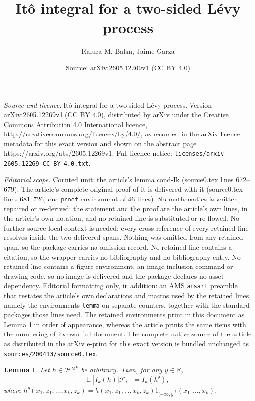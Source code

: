 \documentclass[10pt,a4paper]{amsart}
\title{It\^o integral for a two-sided L\'evy process}
\author{Raluca M. Balan, Jaime Garza}
\date{Source: arXiv:2605.12269v1 (CC BY 4.0)}
\newtheorem{lemma}{Lemma}
\def\bE{\mathbb{E}}
\def\bR{\mathbb{R}}
\def\cF{\mathcal{F}}
\def\cH{\mathcal{H}}
\begin{document}
\maketitle

\noindent\emph{Source and licence.} It\^o integral for a two-sided L\'evy process. Version arXiv:2605.12269v1 (CC BY 4.0), distributed by arXiv under the Creative Commons Attribution 4.0 International licence, http://creativecommons.org/licenses/by/4.0/, as recorded in the arXiv licence metadata for this exact version and shown on the abstract page https://arxiv.org/abs/2605.12269v1. Full licence notice: \texttt{licenses/arxiv-2605.12269-CC-BY-4.0.txt}.\par\smallskip

\noindent\textit{Editorial scope.} Counted unit: the article's lemma cond-Ik (source0.tex lines 672--679). The article's complete original proof of it is delivered with it (source0.tex lines 681--726, one \texttt{proof} environment of 46 lines). No mathematics is written, repaired or re-derived: the statement and the proof are the article's own lines, in the article's own notation, and no retained line is substituted or re-flowed.  No further source-local context is needed: every cross-reference of every retained line resolves inside the two delivered spans.  Nothing was omitted from any retained span, so the package carries no omission record.  No retained line contains a citation, so the wrapper carries no bibliography and no bibliography entry.  No retained line contains a figure environment, an image-inclusion command or drawing code, so no image is delivered and the package declares no asset dependency.  Editorial formatting only, in addition: an AMS \texttt{amsart} preamble that restates the article's own declarations and macros used by the retained lines, namely the environments \texttt{lemma} on separate counters, together with the standard packages those lines need.  The retained environments print in this document as Lemma 1 in order of appearance, whereas the article prints the same items with the numbering of its own full document.  The complete native source of the article as distributed in the arXiv e-print for this exact version is bundled unchanged as \texttt{sources/200413/source0.tex}.
\begin{lemma}
\label{cond-Ik}
Let $h \in \cH^{\otimes k}$ be arbitrary. Then, for any $y \in \bR$,
\[
\bE[I_k(h)|\cF_y]=I_k(h^y), 
\]
where $h^y(x_1,z_1,\ldots,x_k,z_k)=h(x_1,z_1,\ldots,x_k,z_k) 1_{(-\infty,y]^k}(x_1,\ldots,x_k)$.
\end{lemma}
\end{document}
